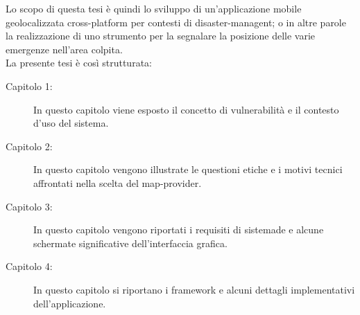 Lo scopo di questa tesi è quindi lo sviluppo di un'applicazione mobile geolocalizzata cross-platform per contesti di disaster-managent; o in altre parole la realizzazione di uno strumento per la segnalare la posizione delle varie emergenze nell'area colpita.\\
La presente tesi è così strutturata:
\begin{description}
\item [Capitolo 1:] In questo capitolo viene esposto il concetto di vulnerabilità e il contesto d'uso del sistema. 
\item [Capitolo 2:] In questo capitolo vengono illustrate le questioni etiche e i motivi tecnici affrontati nella scelta del map-provider.
\item [Capitolo 3:] In questo capitolo vengono riportati i requisiti di sistemade e alcune schermate significative dell'interfaccia grafica.
\item [Capitolo 4:] In questo capitolo si riportano i framework e alcuni dettagli implementativi dell'applicazione.
\end{description}